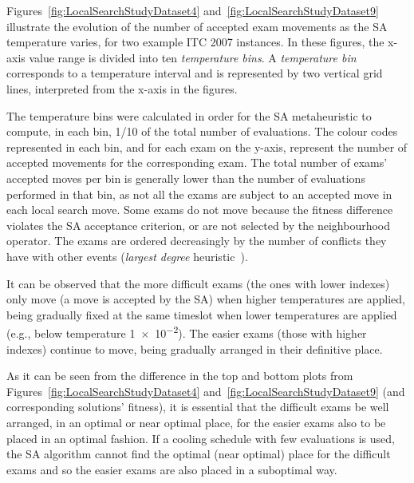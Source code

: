 Figures~\ref{fig:LocalSearchStudyDataset4} and~\ref{fig:LocalSearchStudyDataset9} illustrate the evolution of the number of accepted exam movements as the SA temperature varies, for two example ITC 2007 instances. In these figures, the x-axis value range is divided into ten \textit{temperature bins}. A \textit{temperature bin} corresponds to a temperature interval and is represented by two vertical grid lines, interpreted from the x-axis in the figures.


The temperature bins were calculated in order for the SA metaheuristic to compute, in each bin, 1/10 of the total number of evaluations. The colour codes represented in each bin, and for each exam on the y-axis, represent the number of accepted movements for the corresponding exam. The total number of exams' accepted moves per bin is generally lower than the number of evaluations performed in that bin, as not all the exams are subject to an accepted move in each local search move. Some exams do not move because the fitness difference violates the SA acceptance criterion, or are not selected by the neighbourhood operator. The exams are ordered decreasingly by the number of conflicts they have with other events (\textit{largest degree} heuristic~\citep{Cheong2009}).

It can be observed that the more difficult exams (the ones with lower indexes) only move (a move is accepted by the SA) when higher temperatures are applied, being gradually fixed at the same timeslot when lower temperatures are applied (e.g., below temperature \num{1e-2}). The easier exams (those with higher indexes) continue to move, being gradually arranged in their definitive place. 

As it can be seen from the difference in the top and bottom plots from Figures~\ref{fig:LocalSearchStudyDataset4} and~\ref{fig:LocalSearchStudyDataset9} (and corresponding solutions' fitness), it is essential that the difficult exams be well arranged, in an optimal or near optimal place, for the easier exams also to be placed in an optimal fashion. If a cooling schedule with few evaluations is used, the SA algorithm cannot find the optimal (near optimal) place for the difficult exams and so the easier exams are also placed in a suboptimal way. 

